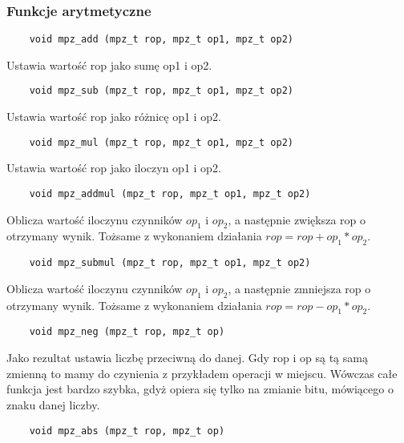 \documentclass[oneside,a4paper]{book}
\begin{document}
	\subsubsection{Funkcje arytmetyczne}
	
	\begin{lstlisting}
	void mpz_add (mpz_t rop, mpz_t op1, mpz_t op2)
	\end{lstlisting}
	
	Ustawia wartość rop jako sumę op1 i op2.
	
	\begin{lstlisting}
	void mpz_sub (mpz_t rop, mpz_t op1, mpz_t op2)
	\end{lstlisting}
	
	Ustawia wartość rop jako różnicę op1 i op2.
	
	\begin{lstlisting}
	void mpz_mul (mpz_t rop, mpz_t op1, mpz_t op2)
	\end{lstlisting}
	
	Ustawia wartość rop jako iloczyn op1 i op2.
	
	\begin{lstlisting}
	void mpz_addmul (mpz_t rop, mpz_t op1, mpz_t op2)
	\end{lstlisting}
	
	Oblicza wartość iloczynu czynników $op_1$ i $op_2$, a następnie zwiększa rop o otrzymany wynik. Tożsame z wykonaniem działania $rop = rop + op_1 * op_2$.
	
	\begin{lstlisting}
	void mpz_submul (mpz_t rop, mpz_t op1, mpz_t op2)
	\end{lstlisting}
	
	Oblicza wartość iloczynu czynników $op_1$ i $op_2$, a następnie zmniejsza rop o otrzymany wynik. Tożsame z wykonaniem działania $rop = rop - op_1 * op_2$.
	
	\begin{lstlisting}
	void mpz_neg (mpz_t rop, mpz_t op)
	\end{lstlisting}
	
	Jako rezultat ustawia liczbę przeciwną do danej. Gdy rop i op są tą samą zmienną to mamy do czynienia z przykładem operacji w miejscu. Wówczas całe funkcja jest bardzo szybka, gdyż opiera się tylko na zmianie bitu, mówiącego o znaku danej liczby.
	
	\begin{lstlisting}
	void mpz_abs (mpz_t rop, mpz_t op)
	\end{lstlisting}
	
\end{document}
